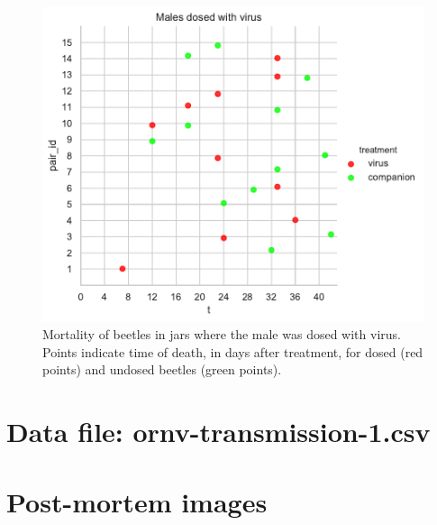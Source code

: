 \documentclass[11pt,letterpaper]{scrartcl}
\begin{document}
\begin{figure}[h]
\centering
\includegraphics[width=\textwidth]{tm.pdf}
\caption{Mortality of beetles in jars where the male was dosed with virus. Points indicate time of death, in days after treatment, for dosed (red points) and undosed beetles (green points).}
\label{fig:tm}
\end{figure}

\clearpage
\appendix

\section{Data file: ornv-transmission-1.csv}

\begin{tiny}

\end{tiny}

\clearpage

\section{Post-mortem images}



\clearpage
\end{document}
